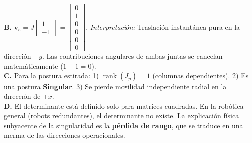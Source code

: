 \documentclass[11pt, a4paper]{article}
\begin{document}
\textbf{B.} $\mathbf{v}_e = J \begin{bmatrix} 1 \\ -1 \end{bmatrix} = \begin{bmatrix} 0 \\ 1 \\ 0 \\ 0 \\ 0 \\ 0 \end{bmatrix}$. \textit{Interpretación:} Traslación instantánea pura en la dirección $+y$. Las contribuciones angulares de ambas juntas se cancelan matemáticamente ($1-1=0$).\\
\textbf{C.} Para la postura estirada: 1) $\operatorname{rank}(J_p) = 1$ (columnas dependientes). 2) Es una postura \textbf{Singular}. 3) Se pierde movilidad independiente radial en la dirección de $+x$.\\
\textbf{D.} El determinante está definido solo para matrices cuadradas. En la robótica general (robots redundantes), el determinante no existe. La explicación física subyacente de la singularidad es la \textbf{pérdida de rango}, que se traduce en una merma de las direcciones operacionales.
\end{document}
